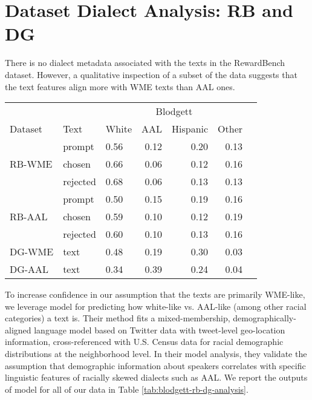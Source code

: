 \section{Dataset Dialect Analysis: \textsc{RB} and DG}
\label{app:blodgett-dataset-analysis-rb-dg}
There is no dialect metadata associated with the texts in the RewardBench dataset. However, a qualitative inspection of a subset of the data suggests that the text features align more with WME texts than AAL ones. 

\begin{table*}[htbp]
\begin{center}
\small
\begin{tabular}{ll|lrrrr}
\toprule
  &  & \multicolumn{4}{c}{Blodgett} \\
 Dataset & Text & White & AAL & Hispanic & Other \\
\midrule
                 & prompt          &   0.56 &   0.12 &   0.20 &   0.13 \\
\textsc{RB-WME}           & chosen          &   0.66 &   0.06 &   0.12 &   0.16 \\
                 & rejected        &   0.68 &   0.06 &   0.13 &   0.13 \\
\hline
                 & prompt          &   0.50 &   0.15 &   0.19 &   0.16 \\
\textsc{RB-AAL}           & chosen          &   0.59 &   0.10 &   0.12 &   0.19 \\
                 & rejected        &   0.60 &   0.10 &   0.13 &   0.16 \\
\midrule
\textsc{DG-WME}           & text           &   0.48 &   0.19 &   0.30 &   0.03 \\
\midrule
\textsc{DG-AAL}           & text           &   0.34 &   0.39 &   0.24 &   0.04 \\
\bottomrule
\end{tabular}
\caption{Dialect Analysis of the \textsc{RB} and \textsc{DG} datasets using \citet{blodgett_demographic_2016} dialect classifier. The predicted probabilities of each dialect for the various dataset splits generally align with our expectations. }
\label{tab:blodgett-rb-dg-analysis}
\end{center}
\end{table*}

To increase confidence in our assumption that the texts are primarily WME-like, we leverage  model for predicting how white-like vs. AAL-like (among other racial categories) a text is. Their method fits a mixed-membership, demographically-aligned language model based on Twitter data with tweet-level geo-location information, cross-referenced with U.S. Census data for racial demographic distributions at the neighborhood level. In their model analysis, they validate the assumption that demographic information about speakers correlates with specific linguistic features of racially skewed dialects such as AAL. We report the outputs of  model for all of our data in Table \ref{tab:blodgett-rb-dg-analysis}.

